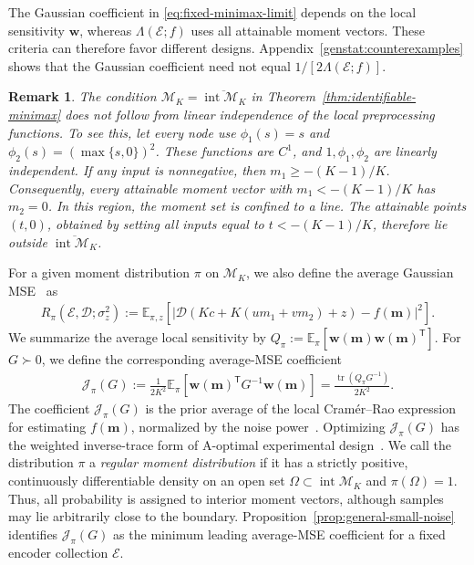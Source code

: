 \documentclass[journal,12pt,onecolumn,draftclsnofoot]{IEEEtran}
\newtheorem{remark}{Remark}
\newcommand{\enc}{\mathscr{E}}\newcommand{\dec}{\mathscr{D}}\newcommand{\R}{\mathbb R}\newcommand{\C}{\mathbb C}
\newcommand{\T}{\mathsf T}\newcommand{\suc}{\succeq}
\begin{document}
The Gaussian coefficient in \eqref{eq:fixed-minimax-limit} depends
on the local sensitivity $\boldsymbol w$, whereas $\Lambda(\enc;f)$
uses all attainable moment vectors. These criteria can therefore
favor different designs. Appendix~\ref{genstat:counterexamples}
shows that the Gaussian coefficient need not equal
$1/[2\Lambda(\enc;f)]$.



\begin{remark}
\label{rem:moment-set-condition}
The condition
$\mathcal M_K=\overline{\operatorname{int}\mathcal M_K}$
in Theorem~\ref{thm:identifiable-minimax} does not follow
from linear independence of the local preprocessing
functions. To see this, let every node use
$\phi_1(s)=s$ and $\phi_2(s)=(\max\{s,0\})^2$.
These functions are $C^1$, and $1,\phi_1,\phi_2$ are
linearly independent. If any input is nonnegative, then
$m_1\ge-(K-1)/K$. Consequently, every attainable moment vector
with $m_1<-(K-1)/K$ has $m_2=0$.
In this region, the moment set is confined to a line.
The attainable points $(t,0)$, obtained by setting all
inputs equal to $t<-(K-1)/K$, therefore lie outside
$\overline{\operatorname{int}\mathcal M_K}$.
\end{remark}




For a given moment distribution $\pi$ on $\mathcal M_K$,
we also define the average Gaussian MSE~\cite{jiao2015minimax} as
\begin{align*}
    R_\pi(\enc,\dec;\sigma_z^2)
 :=
 \mathbb E_{\pi,z}\!\left[
 \left|\dec\!\left(Kc+K(um_1+vm_2)+z\right)
 -f(\boldsymbol m)\right|^2
 \right].
\end{align*}
We summarize the average local sensitivity by $ Q_\pi:=
 \mathbb E_\pi[
 \boldsymbol w(\boldsymbol m)\boldsymbol w(\boldsymbol m)^\T].$ For $G\succ0$, we define the corresponding average-MSE coefficient
\begin{equation}
\begin{aligned}
 \mathcal J_\pi(G)
:=
 \frac{1}{2K^2}\mathbb E_\pi\!\left[
 \boldsymbol w(\boldsymbol m)^\T G^{-1}
 \boldsymbol w(\boldsymbol m)\right]=\frac{\operatorname{tr}(Q_\pi G^{-1})}{2K^2}.
\end{aligned}
 \label{eq:average-mse-coefficient}
\end{equation}
The coefficient $\mathcal J_\pi(G)$ is the prior average of the
local Cram\'er--Rao expression for estimating $f(\boldsymbol m)$,
normalized by the noise power~\cite{tsang2020}. Optimizing $\mathcal J_\pi(G)$ has the weighted inverse-trace form of A-optimal experimental design~\cite{sagnol2010,papp2011}. We call the distribution $\pi$ a \emph{regular moment distribution} if it has a strictly positive, continuously differentiable density on an open set $\Omega\subset\operatorname{int}\mathcal M_K$ and $\pi(\Omega)=1$. Thus, all probability is assigned to interior moment vectors, although samples may lie arbitrarily close to the boundary. Proposition~\ref{prop:general-small-noise} identifies $\mathcal J_\pi(G)$ as the minimum leading average-MSE coefficient for a fixed encoder collection $\enc$.
\end{document}
